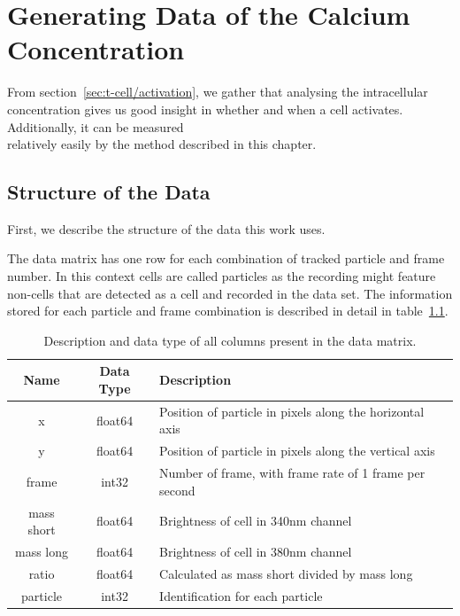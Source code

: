 \chapter{Generating Data of the Calcium Concentration}
\label{chapter:data}

From section~\ref{sec:t-cell/activation}, we gather that analysing the intracellular \Calcium concentration gives us good insight in whether and when a cell activates. Additionally, it can be measured\\ relatively easily by the method described in this chapter.

\section{Structure of the Data}
\label{sec:structure_of_data}

First, we describe the structure of the data this work uses. 

The data matrix has one row for each combination of tracked particle and frame number. In this context cells are called particles as the recording might feature non-cells that are detected as a cell and recorded in the data set. The information stored for each particle and frame combination is described in detail in table~\ref{tab:information_data_matrix}.

\begin{table}[h!]
	\centering
	\begin{tabular}{|c|c|l|}
		\hline
		\textbf{Name} & \textbf{Data Type} & \textbf{Description} \\
		\hline
		x & float64 & Position of particle in pixels along the horizontal axis \\
		\hline
		y & float64 & Position of particle in pixels along the vertical axis \\
		\hline
		frame & int32 & Number of frame, with frame rate of 1 frame per second \\
		\hline
		mass short & float64 & Brightness of cell in 340nm channel \\
		\hline
		mass long & float64 & Brightness of cell in 380nm channel \\
		\hline
		ratio & float64 & Calculated as mass short divided by mass long \\
		\hline
		particle & int32 & Identification for each particle \\
		\hline
	\end{tabular}
	\caption{Description and data type of all columns present in the data matrix.}
	\label{tab:information_data_matrix}
\end{table}


